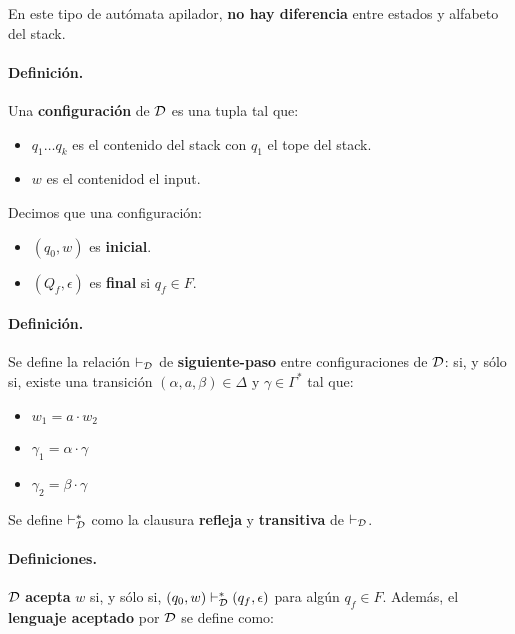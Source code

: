 En este tipo de autómata apilador, \textbf{no hay diferencia} entre estados y alfabeto del stack.

\paragraph*{Definición.} Una \textbf{configuración} de $\mathcal{D}$ es una tupla
tal que:
\begin{itemize}
    \item $q_1\ldots q_k$ es el contenido del stack con $q_1$ el tope del stack.
    \item $w$ es el contenidod el input.
\end{itemize}
Decimos que una configuración:
\begin{itemize}
    \item $(q_0,w)$ es \textbf{inicial}.
    \item $(Q_f,\epsilon)$ es \textbf{final} si $q_f \in F$.
\end{itemize}

\paragraph*{Definición.} Se define la relación $\vdash_{\mathcal{D}}$ de \textbf{siguiente-paso} entre configuraciones de $\mathcal{D}$:
si, y sólo si, existe una transición $\left(\alpha, a, \beta\right) \in \Delta \text { y } \gamma \in \Gamma^*$ tal que:
\begin{itemize}
    \item $w_1 = a \cdot w_2$
    \item $\gamma_1 = \alpha\cdot \gamma$
    \item $\gamma_2 = \beta \cdot \gamma$
\end{itemize}

Se define $\vdash_{\mathcal{D}}^*$ como la clausura \textbf{refleja} y \textbf{transitiva} de $\vdash_{\mathcal{D}}$.

\paragraph*{Definiciones.} $\mathcal{D}$ \textbf{acepta} $w$ si, y sólo si, $(q_0,w) \vdash_{\mathcal{D}}^* (q_f,\epsilon)$ para algún $q_f \in F$. Además, el \textbf{lenguaje aceptado} por $\mathcal{D}$ se define como:

